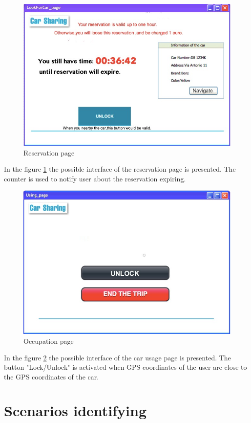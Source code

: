 \documentclass[12pt, letterpaper]{article}
\begin{document}
\begin{figure}[H]
\centering
\includegraphics[width=12cm]{Reserved.jpg}
\caption{Reservation page}
\label{fig:Reserve}
\end{figure}

In the figure \ref{fig:Reserve} the possible interface of the reservation page is presented. The counter is used to notify user about the reservation expiring. 

\begin{figure}[H]
\centering
\includegraphics[width=12cm]{Occupied.jpg}
\caption{Occupation page}
\label{fig:Occupy}
\end{figure}

In the figure \ref{fig:Occupy} the possible interface of the car usage page is presented. The button "Lock/Unlock" is activated when GPS coordinates of the user are close to the GPS coordinates of the car.
\newpage


\section{Scenarios identifying}
\end{document}
